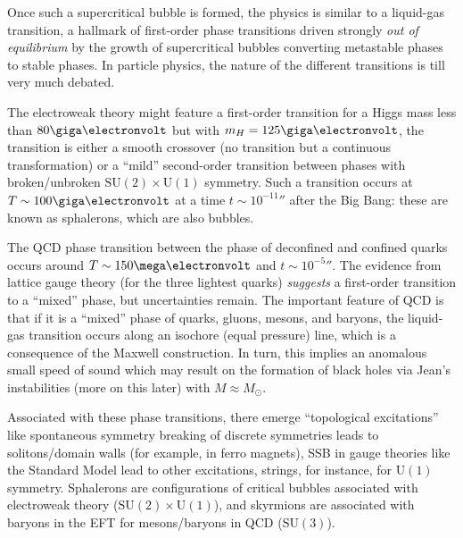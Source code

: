 \documentclass[a4paper,twoside,master.tex]{subfiles}
\begin{document}
Once such a supercritical bubble is formed, the physics is similar to a liquid-gas transition, a hallmark of first-order phase transitions driven strongly \textit{out of equilibrium} by the growth of supercritical bubbles converting metastable phases to stable phases. In particle physics, the nature of the different transitions is till very much debated.

The electroweak theory might feature a first-order transition for a Higgs mass less than $ 80 \giga\electronvolt $ but with $ m_H = 125 \giga\electronvolt $, the transition is either a smooth crossover (no transition but a continuous transformation) or a ``mild'' second-order transition between phases with broken/unbroken $ \text{SU}(2) \times \text{U}(1) $ symmetry. Such a transition occurs at $ T \sim 100 \giga\electronvolt $ at a time $ t \sim 10^{-11} \second $ after the Big Bang: these are known as sphalerons, which are also bubbles.

The QCD phase transition between the phase of deconfined and confined quarks occurs around $ T \sim 150 \mega\electronvolt $ and $ t \sim 10^{-5} \second $. The evidence from lattice gauge theory (for the three lightest quarks) \textit{suggests} a first-order transition to a ``mixed'' phase, but uncertainties remain. The important feature of QCD is that if it is a ``mixed'' phase of quarks, gluons, mesons, and baryons, the liquid-gas transition occurs along an isochore (equal pressure) line, which is a consequence of the Maxwell construction. In turn, this implies an anomalous small speed of sound which may result on the formation of black holes via Jean's instabilities (more on this later) with $ M \approx M_{\odot} $.

Associated with these phase transitions, there emerge ``topological excitations'' like spontaneous symmetry breaking of discrete symmetries leads to solitons/domain walls (for example, in ferro magnets), SSB in gauge theories like the Standard Model lead to other excitations, strings, for instance, for $ \text{U}(1) $ symmetry. Sphalerons are configurations of critical bubbles associated with electroweak theory ($ \text{SU}(2) \times \text{U}(1) $), and skyrmions are associated with baryons in the EFT for mesons/baryons in QCD ($ \text{SU}(3) $).
\end{document}
